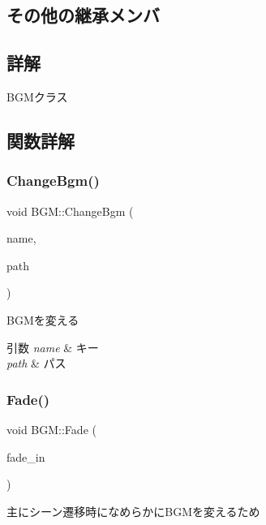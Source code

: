 \subsection*{その他の継承メンバ}


\subsection{詳解}
B\+G\+Mクラス 

\subsection{関数詳解}
\mbox{\label{class_b_g_m_a67e626cf0e596ca4fcf74df02fadf882}} 
\subsubsection{\texorpdfstring{Change\+Bgm()}{ChangeBgm()}}
{\footnotesize\ttfamily void B\+G\+M\+::\+Change\+Bgm (\begin{DoxyParamCaption}\item[{const std\+::string \&}]{name,  }\item[{W\+C\+H\+AR $\ast$}]{path }\end{DoxyParamCaption})}



B\+G\+Mを変える 


\begin{DoxyParams}{引数}
{\em name} & キー \\
\hline
{\em path} & パス \\
\hline
\end{DoxyParams}
\mbox{\label{class_b_g_m_a63645262b99c4d3aef0a58d9b972f674}} 
\subsubsection{\texorpdfstring{Fade()}{Fade()}}
{\footnotesize\ttfamily void B\+G\+M\+::\+Fade (\begin{DoxyParamCaption}\item[{const bool}]{fade\+\_\+in }\end{DoxyParamCaption})}



主にシーン遷移時になめらかに\+B\+G\+Mを変えるため 


